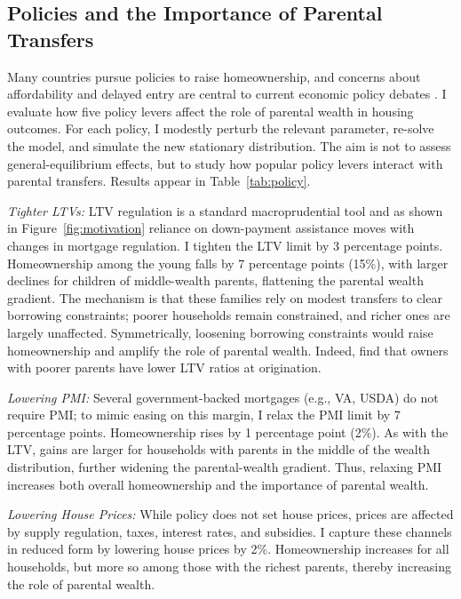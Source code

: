 \documentclass[12pt]{article}
\begin{document}
\subsection{Policies and the Importance of Parental Transfers}
Many countries pursue policies to raise homeownership, and concerns about affordability and delayed entry are central to current economic policy debates \citep[e.g.,][]{Mabille2020}. I evaluate how five policy levers affect the role of parental wealth in housing outcomes. For each policy, I modestly perturb the relevant parameter, re-solve the model, and simulate the new stationary distribution. The aim is not to assess general-equilibrium effects, but to study how popular policy levers interact with parental transfers. Results appear in Table~\ref{tab:policy}.

\textit{Tighter LTVs:} LTV regulation is a standard macroprudential tool and as shown in Figure~\ref{fig:motivation} reliance on down-payment assistance moves with changes in mortgage regulation. I tighten the LTV limit by 3 percentage points. Homeownership among the young falls by 7 percentage points (15\%), with larger declines for children of middle-wealth parents, flattening the parental wealth gradient. The mechanism is that these families rely on modest transfers to clear borrowing constraints; poorer households remain constrained, and richer ones are largely unaffected. Symmetrically, loosening borrowing constraints would raise homeownership and amplify the role of parental wealth. Indeed, \citet{wold2024housing} find that owners with poorer parents have lower LTV ratios at origination.

\textit{Lowering PMI:} Several government-backed mortgages (e.g., VA, USDA) do not require PMI; to mimic easing on this margin, I relax the PMI limit by 7 percentage points. Homeownership rises by 1 percentage point (2\%). As with the LTV, gains are larger for households with parents in the middle of the wealth distribution, further widening the parental-wealth gradient. Thus, relaxing PMI increases both overall homeownership and the importance of parental wealth.

\textit{Lowering House Prices:} While policy does not set house prices, prices are affected by supply regulation, taxes, interest rates, and subsidies. I capture these channels in reduced form by lowering house prices by 2\%. Homeownership increases for all households, but more so among those with the richest parents, thereby increasing the role of parental wealth.
\end{document}
